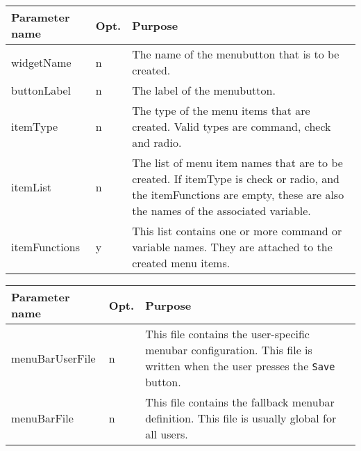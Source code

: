 {\newpage
\clearpage
\samepage \begin{figure}[ht]
  \centerline{
  \epsfysize=7.5cm
  }

  \label{fig:KeysymBox}
\end{figure}
}

{\newpage
\clearpage
\samepage \begin{tabular}{|l|l|p{6.5cm}|} \hline
Parameter name & Opt. & Purpose \\  \hline
widgetName     & n    & The name of the menubutton that is
                        to be created.\\  \hline
buttonLabel    & n    & The label of the menubutton.\\  \hline
itemType       & n    & The type of the menu items that are
                        created. Valid types are command,
                        check and radio.\\  \hline
itemList       & n    & The list of menu item names that are
                        to be created. If itemType is check
                        or radio, and the itemFunctions are
                        empty, these are also the names of
                        the associated variable.\\  \hline
itemFunctions  & y    & This list contains one or more
                        command or variable names. They are
                        attached to the created menu
                        items.\\  \hline
\end{tabular}
}

{\newpage
\clearpage
\samepage \begin{figure}[ht]
  \centerline{
  \epsfysize=4cm
  }

  \label{fig:MakeMButton}
\end{figure}
}

{\newpage
\clearpage
\samepage \begin{tabular}{|l|l|p{6.5cm}|} \hline
Parameter name  & Opt. & Purpose\\  \hline
menuBarUserFile & n    & This file contains the
                         user-specific menubar
                         configuration. This file is written
                         when the user presses the
                         {\tt Save\tt} button.\\  \hline
menuBarFile     & n    & This file contains the fallback
                         menubar definition. This file is
                         usually global for all users.\\  \hline
\end{tabular}
}

